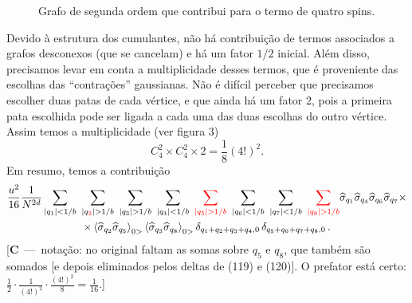 \documentclass[12pt,a4paper]{article}
\newcommand{\sh}{\widehat{\sigma}}
\newcommand{\corr}[1]{\textcolor{red}{#1}}
\newcounter{corr}
\newcommand{\nota}[2]{\refstepcounter{corr}\label{#1}%
  {\color{red}\small[\textbf{C\thecorr}~---~#2]}}
\begin{document}
\begin{figure}[H]
\centering
{}
\caption{Grafo de segunda ordem que contribui para o termo de quatro spins.}
\end{figure}


Devido à estrutura dos
cumulantes, não há contribuição de termos associados a grafos desconexos (que
se cancelam) e há um fator $1/2$ inicial. Além disso, precisamos levar em
conta a multiplicidade desses termos, que é proveniente das escolhas das
``contrações'' gaussianas. Não é difícil perceber que precisamos escolher duas
patas de cada vértice, e que ainda há um fator 2, pois a primeira pata
escolhida pode ser ligada a cada uma das duas escolhas do outro vértice. Assim
temos a multiplicidade (ver figura 3)
\begin{equation}
C_4^2\times C_4^2\times2=\frac18\left(4!\right)^2.
\end{equation}
Em resumo, temos a contribuição
\begin{multline}
\frac{u^2}{16}\frac{1}{N^{2d}}\sum_{|q_1|<1/b}\ \sum_{|q_{\corr{2}}|>1/b}\ \sum_{|q_3|>1/b}\ \sum_{|q_4|<1/b}\ \corr{\sum_{|q_5|>1/b}}\ \sum_{|q_6|<1/b}\ \sum_{|q_7|<1/b}\ \corr{\sum_{|q_8|>1/b}}
\sh_{q_1}\sh_{q_4}\sh_{q_6}\sh_{q_7}\times\\
\times\left\langle\sh_{q_2}\sh_{q_5}\right\rangle_{0>}\left\langle\sh_{q_3}\sh_{q_8}\right\rangle_{0>}\delta_{q_1+q_2+q_3+q_4,0}\,\delta_{q_5+q_6+q_7+q_8,0}\,.
\end{multline}
\nota{c:sum118}{notação: no original faltam as somas sobre $q_5$ e $q_8$, que também são somados
[e depois eliminados pelos deltas de (119) e (120)]. O prefator está certo:
$\tfrac12\cdot\tfrac{1}{(4!)^2}\cdot\tfrac{(4!)^2}{8}=\tfrac1{16}$.}
\end{document}
